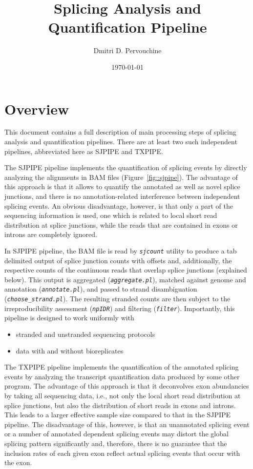 \documentclass{article}
\newcommand{\prog}[1]{{\tt\em #1}}
\begin{document}
\title{Splicing Analysis and Quantification Pipeline}
\author{Dmitri D. Pervouchine}
\date{\today}
\maketitle

\tableofcontents

\section{Overview}
This document contains a full description of main processing steps of splicing analysis and quantification pipelines. 
There are at least two such independent pipelines, abbreviated here as SJPIPE and TXPIPE. 

The SJPIPE pipeline implements the quantification of splicing events by directly analyzing the alignments in BAM files 
(Figure~\ref{fig::sjpipe}). The advantage of this approach is that it allows to quantify the annotated as well as 
novel splice junctions, and there is no annotation-related interference between independent splicing events. An obvious 
disadvantage, however, is that only a part of the sequencing information is used, one which is related to local short 
read distribution at splice junctions, while the reads that are contained in exons or introns are completely ignored.

In SJPIPE pipeline, the BAM file is read by \prog{sjcount} utility to produce a tab delimited output of splice junction 
counts with offsets and, additionally, the respective counts of the continuous reads that overlap splice junctions (explained 
below). This output is aggregated (\prog{aggregate.pl}), matched against genome and annotation (\prog{annotate.pl}), and 
passed to strand disambiguation (\prog{choose\_strand.pl}). The resulting stranded counts are then subject to the 
irreproducibility assessment (\prog{npIDR}) and filtering (\prog{filter}). Importantly, this pipeline is designed to 
work uniformly with
\begin{itemize}
\item stranded and unstranded sequencing protocols
\item data with and without bioreplicates
\end{itemize}

The TXPIPE pipeline implements the quantification of the annotated splicing events by analyzing the transcript quantification 
data produced by some other program. The advantage of this approach is that it deconvolves exon abundancies by taking all
sequencing data, i.e., not only the local short read distribution at splice junctions, but also the distribution of short reads 
in exons and introns. This leads to a larger effective sample size compared to that in the SJPIPE pipeline. The disadvantage of 
this, however, is that an unannotated splicing event or a number of annotated dependent splicing events may distort the global 
splicing pattern significantly and, therefore, there is no guarantee that the inclusion rates of each given exon reflect actual 
splicing events that occur with the exon.
\end{document}
